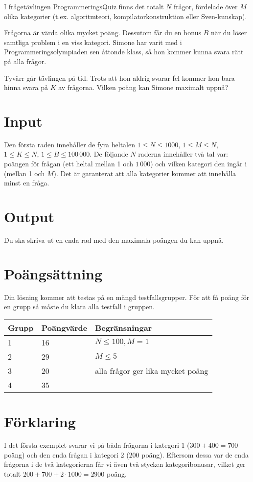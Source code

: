 I frågetävlingen ProgrammeringsQuiz finns det totalt $N$ frågor, fördelade över $M$ olika kategorier (t.ex. algoritmteori,
kompilatorkonstruktion eller Sven-kunskap).

Frågorna är värda olika mycket poäng. Dessutom får du en bonus $B$ när du löser samtliga problem i en viss kategori.
Simone har varit med i Programmeringsolympiaden sen åttonde klass, så hon kommer kunna svara rätt på alla frågor.

Tyvärr går tävlingen på tid. Trots att hon aldrig svarar fel kommer hon bara hinna svara på $K$ av frågorna.
Vilken poäng kan Simone maximalt uppnå?

\section*{Input}
Den första raden innehåller de fyra heltalen $1 \le N \le 1000$, $1 \le M \le N$, $1 \le K \le N$, $1 \le B \le 100\,000$.
De följande $N$ raderna innehåller två tal var: poängen för frågan (ett heltal mellan 1 och $1\,000$) och vilken kategori den ingår i (mellan 1 och $M$).
Det är garanterat att alla kategorier kommer att innehålla minst en fråga.

\section*{Output}
Du ska skriva ut en enda rad med den maximala poängen du kan uppnå.

\section*{Poängsättning}
Din lösning kommer att testas på en mängd testfallsgrupper. För att få poäng för en grupp så måste du klara alla testfall i gruppen.

\begin{tabular}{| l | l | l |}
  \hline
  Grupp & Poängvärde & Begränsningar\\ \hline
  1     & 16         & $N \le 100, M = 1$ \\ \hline
  2     & 29         & $M \le 5$ \\ \hline
  3     & 20         & alla frågor ger lika mycket poäng \\ \hline
  4     & 35         & \\ \hline
\end{tabular}

\section*{Förklaring}
I det första exemplet svarar vi på båda frågorna i kategori 1 ($300 + 400 = 700$ poäng) och den enda frågan i kategori 2 ($200$ poäng). Eftersom
dessa var de enda frågorna i de två kategorierna får vi även två stycken kategoribonusar, vilket ger totalt $200 + 700 + 2 \cdot 1000 = 2900$
poäng.
